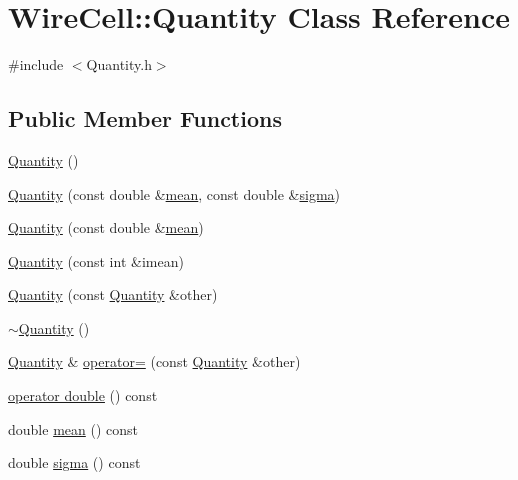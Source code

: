 \hypertarget{class_wire_cell_1_1_quantity}{}\section{Wire\+Cell\+:\+:Quantity Class Reference}
\label{class_wire_cell_1_1_quantity}


{\ttfamily \#include $<$Quantity.\+h$>$}

\subsection*{Public Member Functions}
\begin{DoxyCompactItemize}
\item 
\hyperlink{class_wire_cell_1_1_quantity_afac627efec0b3e5085d7ad37d9edc45c}{Quantity} ()
\item 
\hyperlink{class_wire_cell_1_1_quantity_a4de6e58367552cea905f558399ea9292}{Quantity} (const double \&\hyperlink{class_wire_cell_1_1_quantity_a03e883ed20833962578c23ca9e51cd0f}{mean}, const double \&\hyperlink{class_wire_cell_1_1_quantity_a0971c6bc040bd7b9a48ae556cdcf3c85}{sigma})
\item 
\hyperlink{class_wire_cell_1_1_quantity_a86228d6e5fa925636722e8f960b7a7d5}{Quantity} (const double \&\hyperlink{class_wire_cell_1_1_quantity_a03e883ed20833962578c23ca9e51cd0f}{mean})
\item 
\hyperlink{class_wire_cell_1_1_quantity_a128ed8961290f7f615ac62c40886b837}{Quantity} (const int \&imean)
\item 
\hyperlink{class_wire_cell_1_1_quantity_ac5ae8f6f8db2543010d5cfceca391dd6}{Quantity} (const \hyperlink{class_wire_cell_1_1_quantity}{Quantity} \&other)
\item 
\hyperlink{class_wire_cell_1_1_quantity_a79c2ff3a42cc435ce0dfe93a4100ad4c}{$\sim$\+Quantity} ()
\item 
\hyperlink{class_wire_cell_1_1_quantity}{Quantity} \& \hyperlink{class_wire_cell_1_1_quantity_a68dc322e300bfe367131389755ae631f}{operator=} (const \hyperlink{class_wire_cell_1_1_quantity}{Quantity} \&other)
\item 
\hyperlink{class_wire_cell_1_1_quantity_a808d00967fddeaa0a5aaeff938edc41d}{operator double} () const
\item 
double \hyperlink{class_wire_cell_1_1_quantity_a03e883ed20833962578c23ca9e51cd0f}{mean} () const
\item 
double \hyperlink{class_wire_cell_1_1_quantity_a0971c6bc040bd7b9a48ae556cdcf3c85}{sigma} () const

\end{DoxyCompactItemize}
